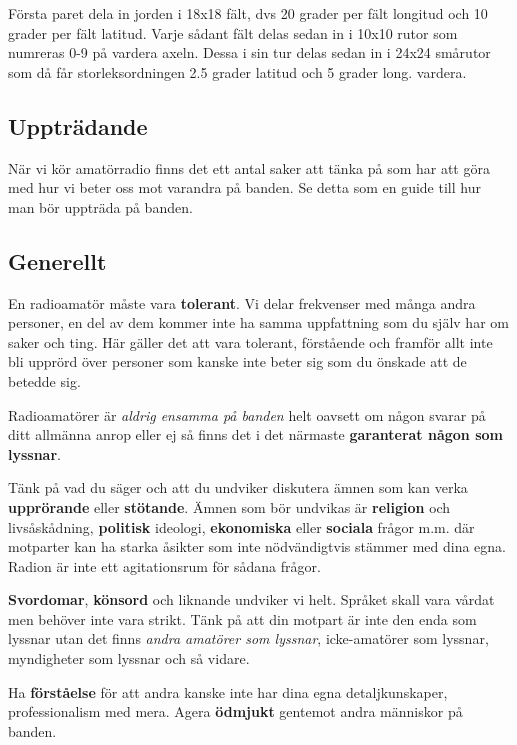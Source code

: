 Första paret dela in jorden i 18x18 fält, dvs 20 grader per fält longitud och 10 grader per fält latitud. Varje sådant fält delas sedan in i 10x10 rutor som numreras 0-9 på vardera axeln. Dessa i sin tur delas sedan in i 24x24 smårutor som då får storleksordningen 2.5 grader latitud och 5 grader long. vardera.

\subsection{Uppträdande}

När vi kör amatörradio finns det ett antal saker att tänka på som har att göra med hur vi beter oss mot varandra på banden. Se detta som en guide till hur man bör uppträda på banden.

\subsection{Generellt}

En radioamatör måste vara \textbf{tolerant}. Vi delar frekvenser med många andra personer, en del av dem kommer inte ha samma uppfattning som du själv har om saker och ting. Här gäller det att vara tolerant, förstående och framför allt inte bli upprörd över personer som kanske inte beter sig som du önskade att de betedde sig.

Radioamatörer är \emph{aldrig ensamma på banden} helt oavsett om någon svarar på ditt allmänna anrop eller ej så finns det i det närmaste \textbf{garanterat någon som lyssnar}. 

Tänk på vad du säger och att du undviker diskutera ämnen som kan verka \textbf{upprörande} eller \textbf{stötande}. Ämnen som bör undvikas är \textbf{religion} och livs\-å\-skå\-d\-ni\-ng, \textbf{politisk} ideologi, \textbf{ekonomiska} eller \textbf{sociala} frågor m.m. där motparter kan ha starka åsikter som inte nödvändigtvis stämmer med dina egna. Radion är inte ett agitationsrum för sådana frågor.

\textbf{Svordomar}, \textbf{könsord} och liknande undviker vi helt. Språket skall vara vårdat men behöver inte vara strikt. Tänk på att din motpart är inte den enda som lyssnar utan det finns \textit{andra amatörer som lyssnar}, icke-amatörer som lyssnar, myndigheter som lyssnar och så vidare.

Ha \textbf{förståelse} för att andra kanske inte har dina egna detaljkunskaper, professionalism med mera. Agera \textbf{ödmjukt} gentemot andra människor på banden.

